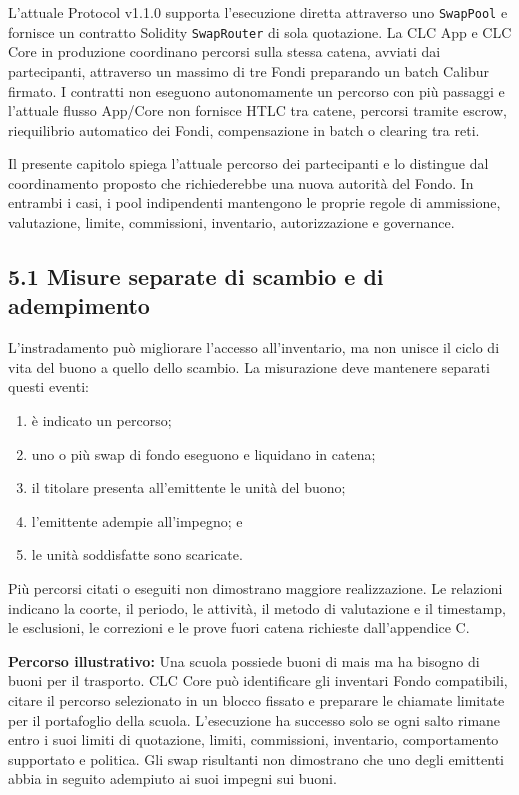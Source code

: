 \documentclass[11pt]{article}
\begin{document}
L'attuale Protocol v1.1.0 supporta l'esecuzione diretta attraverso uno \texttt{SwapPool} e fornisce un contratto Solidity \texttt{SwapRouter} di sola quotazione. La CLC App e CLC Core in produzione coordinano percorsi sulla stessa catena, avviati dai partecipanti, attraverso un massimo di tre Fondi preparando un batch Calibur firmato. I contratti non eseguono autonomamente un percorso con più passaggi e l'attuale flusso App/Core non fornisce HTLC tra catene, percorsi tramite escrow, riequilibrio automatico dei Fondi, compensazione in batch o clearing tra reti.

Il presente capitolo spiega l'attuale percorso dei partecipanti e lo distingue dal coordinamento proposto che richiederebbe una nuova autorità del Fondo. In entrambi i casi, i pool indipendenti mantengono le proprie regole di ammissione, valutazione, limite, commissioni, inventario, autorizzazione e governance.

\subsection*{5.1 Misure separate di scambio e di adempimento}

L'instradamento può migliorare l'accesso all'inventario, ma non unisce il ciclo di vita del buono a quello dello scambio. La misurazione deve mantenere separati questi eventi:

\begin{enumerate}[leftmargin=*]
\item è indicato un percorso;
\item uno o più swap di fondo eseguono e liquidano in catena;
\item il titolare presenta all'emittente le unità del buono;
\item l'emittente adempie all'impegno; e
\item le unità soddisfatte sono scaricate.
\end{enumerate}
Più percorsi citati o eseguiti non dimostrano maggiore realizzazione. Le relazioni indicano la coorte, il periodo, le attività, il metodo di valutazione e il timestamp, le esclusioni, le correzioni e le prove fuori catena richieste dall'appendice C.

\textbf{Percorso illustrativo:} Una scuola possiede buoni di mais ma ha bisogno di buoni per il trasporto. CLC Core può identificare gli inventari Fondo compatibili, citare il percorso selezionato in un blocco fissato e preparare le chiamate limitate per il portafoglio della scuola. L'esecuzione ha successo solo se ogni salto rimane entro i suoi limiti di quotazione, limiti, commissioni, inventario, comportamento supportato e politica. Gli swap risultanti non dimostrano che uno degli emittenti abbia in seguito adempiuto ai suoi impegni sui buoni.
\end{document}
